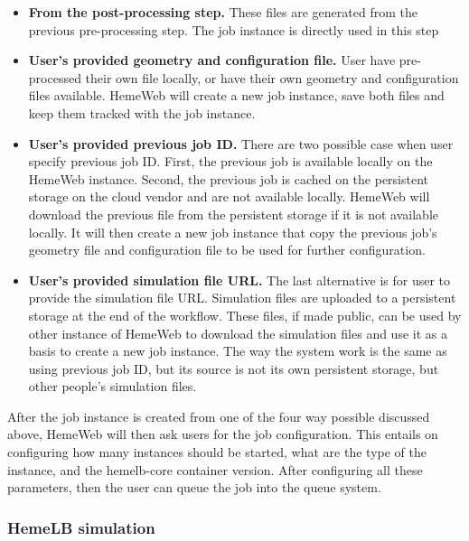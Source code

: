 \begin{itemize}
    \item \textbf{From the post-processing step.}
    	These files are generated from the previous pre-processing step. The job instance is directly used in this step
    
    \item \textbf{User's provided geometry and configuration file.}
    	User have pre-processed their own file locally, or have their own geometry and configuration files available. HemeWeb will create a new job instance, save both files and keep them tracked with the job instance.
	
    \item \textbf{User's provided previous job ID.}
    	There are two possible case when user specify previous job ID. First, the previous job is available locally on the HemeWeb instance. Second, the previous job is cached on the persistent storage on the cloud vendor and are not available locally. HemeWeb will download the previous file from the persistent storage if it is not available locally. It will then create a new job instance that copy the previous job's geometry file and configuration file to be used for further configuration.
    
    \item \textbf{User's provided simulation file URL.}
    	The last alternative is for user to provide the simulation file URL. Simulation files are uploaded to a persistent storage at the end of the workflow. These files, if made public, can be used by other instance of HemeWeb to download the simulation files and use it as a basis to create a new job instance. The way the system work is the same as using previous job ID, but its source is not its own persistent storage, but other people's simulation files.

\end{itemize}


After the job instance is created from one of the four way possible discussed above, HemeWeb will then ask users for the job configuration. This entails on configuring how many instances should be started, what are the type of the instance, and the hemelb-core container version.  After configuring all these parameters, then the user can queue the job into the queue system.	



\subsubsection{HemeLB simulation}

